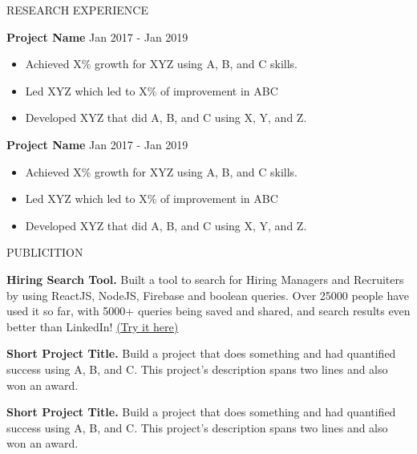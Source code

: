 \documentclass[UTF8]{resume} %
\begin{document}


\begin{rSection}{\textcolor{TITLEBLUE}{RESEARCH EXPERIENCE}}

    \textbf{Project Name} \hfill Jan 2017 - Jan 2019
     \begin{itemize}
        \itemsep -3pt {} 
         \item Achieved X\% growth for XYZ using A, B, and C skills.
         \item Led XYZ which led to X\% of improvement in ABC
        \item Developed XYZ that did A, B, and C using X, Y, and Z. 
     \end{itemize}
     
    \textbf{Project Name} \hfill Jan 2017 - Jan 2019
     \begin{itemize}
        \itemsep -3pt {} 
         \item Achieved X\% growth for XYZ using A, B, and C skills.
         \item Led XYZ which led to X\% of improvement in ABC
        \item Developed XYZ that did A, B, and C using X, Y, and Z. 
     \end{itemize}
    
    \end{rSection} 


\begin{rSection}{\textcolor{TITLEBLUE}{PUBLICITION}}
\vspace{-1.25em}
\item \textbf{Hiring Search Tool.} {Built a tool to search for Hiring Managers and Recruiters by using ReactJS, NodeJS, Firebase and boolean queries. Over 25000 people have used it so far, with 5000+ queries being saved and shared, and search results even better than LinkedIn! \href{https://hiring-search.careerflow.ai/}{(Try it here)}}
\item \textbf{Short Project Title.} {Build a project that does something and had quantified success using A, B, and C. This project's description spans two lines and also won an award.}
\item \textbf{Short Project Title.} {Build a project that does something and had quantified success using A, B, and C. This project's description spans two lines and also won an award.}
\end{rSection} 
\end{document}
